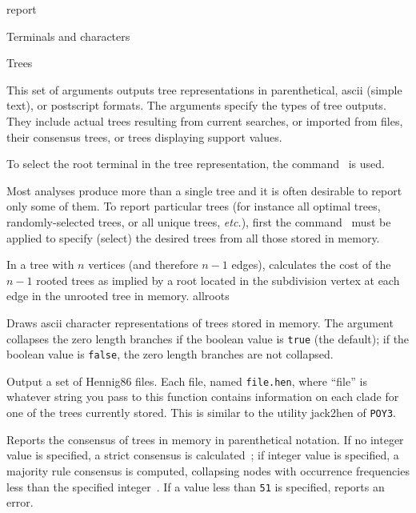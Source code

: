 \begin{command}{report}{}
\begin{arguments}
\begin{argumentgroup}{Terminals and characters}
		\end{argumentgroup}

		\begin{argumentgroup}{Trees}
            {This set of arguments outputs tree representations
            in parenthetical, ascii (simple text), or postscript formats.
            The arguments specify the types of tree outputs. They include
            actual trees resulting from current searches, or imported from
            files, their consensus trees, or trees displaying support values.
            
            To select the root terminal in the tree representation, the command~ is used.
            
            Most analyses produce more than a single tree and it is
            often desirable to report only some of them. To
            report particular trees (for instance all optimal trees,
            randomly-selected trees, or all unique trees, \emph{etc.}), first the
            command~ must be applied to specify (select)
             the desired trees from all those stored in memory.} 

                {In a tree with $n$ vertices (and therefore $n - 1$ edges),
                calculates the cost of the $n - 1$ rooted trees as implied by a
                root located in the subdivision vertex at each edge in the unrooted
                tree in memory.}
                {allroots}

                {Draws ascii character representations of trees stored in memory. The
                argument  collapses the zero length branches if
                the boolean value is \texttt{true} (the default); if the boolean value is
                \texttt{false}, the zero length branches are not collapsed.}
				{}

	     {Output a set of Hennig86 files. Each file, named \texttt{file.hen},
                where ``file'' is whatever string you pass to this function
                contains information on each clade for one of the trees
                currently stored. This is similar to the utility jack2hen 
                of \texttt{POY3}.}
				{}

                {Reports the consensus of trees in memory in parenthetical notation.
                If no integer value is
                specified, a strict consensus is calculated~\cite{rohlf1982};
                if integer value is specified,
                a majority rule consensus is computed, collapsing nodes with
                occurrence frequencies less than the specified integer~\cite{margush1981}.
                If a value less
                than \texttt{51} is specified, \poy reports an error.} 
                {}


\end{argumentgroup}
\end{arguments}
\end{command}
